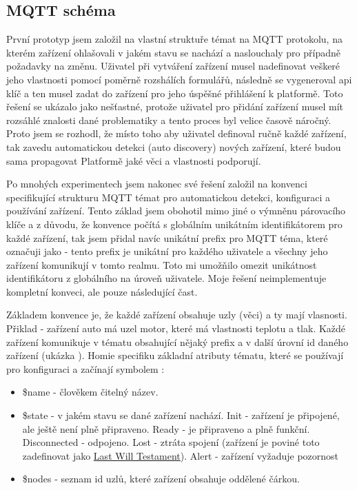 \subsection{MQTT schéma}
První prototyp jsem založil na vlastní struktuře témat na MQTT protokolu, na kterém zařízení ohlašovali v jakém stavu se nachází a naslouchaly pro případně požadavky na změnu. Uživatel při vytváření zařízení musel nadefinovat veškeré jeho vlastnosti pomocí poměrně rozshálích formulářů, následně se vygeneroval api klíč a ten musel zadat do zařízení pro jeho úspěšné přihlášení k platformě. Toto řešení se ukázalo jako nešťastné, protože uživatel pro přidání zařízení musel mít rozsáhlé znalosti dané problematiky a tento proces byl velice časově náročný. Proto jsem se rozhodl, že místo toho aby uživatel definoval ručně každé zařízení, tak zavedu automatickou detekci (auto discovery) nových zařízení, které budou sama propagovat Platformě jaké věci a vlastnosti podporují.

Po mnohých experimentech jsem nakonec své řešení založil na konvenci  specifikující strukturu MQTT témat pro automatickou detekci, konfiguraci a používání zařízení. Tento základ jsem obohotil mimo jiné o výmněnu párovacího klíče a z důvodu, že konvence počítá s globálním unikátním identifikátorem pro každé zařízení, tak jsem přidal navíc unikátní prefix pro MQTT téma, které označuji jako  - tento prefix je unikátní pro každého uživatele a všechny jeho zařízení komunikují v tomto realmu. Toto mi umožňilo omezit unikátnost identifikátoru z globálního na úroveň uživatele. Moje řešení neimplementuje kompletní konveci, ale pouze následující čast.

Základem  konvence je, že každé zařízení obsahuje uzly (věci) a ty mají vlasnosti. Přiklad - zařízení auto má uzel motor, které má vlastnosti teplotu a tlak. Každé zařízení komunikuje v tématu obsahující nějaký prefix a v další úrovní id daného zařízení (ukázka ). Homie specifiku základní atributy tématu, které se používají pro konfiguraci a začínají symbolem \uv{\$}:
\begin{itemize}
    \item \$name - člověkem čitelný název.
    \item \$state - v jakém stavu se dané zařízení nachází. Init - zařízení je připojené, ale ještě není plně připraveno. Ready - je připraveno a plně funkční. Disconnected - odpojeno. Lost - ztráta spojení (zařízení je poviné toto zadefinovat jako \hyperlink{LWT}{Last Will Testament}). Alert - zařízení vyžaduje pozornost
    \item \$nodes - seznam id uzlů, které zařízení obsahuje oddělené čárkou.
\end{itemize}

